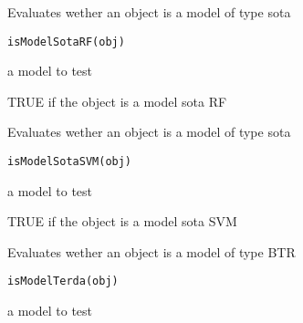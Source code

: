 \documentclass[a4paper]{book}
\begin{document}
%
\begin{Description}
Evaluates wether an object is a model of type sota
\end{Description}
%
\begin{Usage}
\begin{verbatim}
isModelSotaRF(obj)
\end{verbatim}
\end{Usage}
%
\begin{Arguments}
\begin{ldescription}
\item[\code{mod:}] a model to test
\end{ldescription}
\end{Arguments}
%
\begin{Value}
TRUE if the object is a model sota RF
\end{Value}
%
\begin{Description}
Evaluates wether an object is a model of type sota
\end{Description}
%
\begin{Usage}
\begin{verbatim}
isModelSotaSVM(obj)
\end{verbatim}
\end{Usage}
%
\begin{Arguments}
\begin{ldescription}
\item[\code{obj:}] a model to test
\end{ldescription}
\end{Arguments}
%
\begin{Value}
TRUE if the object is a model sota SVM
\end{Value}
%
\begin{Description}
Evaluates wether an object is a model of type BTR
\end{Description}
%
\begin{Usage}
\begin{verbatim}
isModelTerda(obj)
\end{verbatim}
\end{Usage}
%
\begin{Arguments}
\begin{ldescription}
\item[\code{mod:}] a model to test
\end{ldescription}
\end{Arguments}
\end{document}
